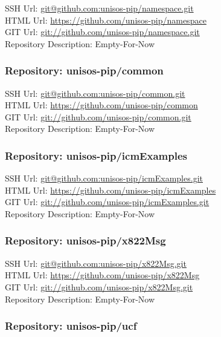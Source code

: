 SSH Url:  \url{git@github.com:unisos-pip/namespace.git}\\
HTML Url: \url{https://github.com/unisos-pip/namespace}\\
GIT Url:  \url{git://github.com/unisos-pip/namespace.git}\\


Repository Description: Empty-For-Now

\subsubsection{Repository: unisos-pip/common}

SSH Url:  \url{git@github.com:unisos-pip/common.git}\\
HTML Url: \url{https://github.com/unisos-pip/common}\\
GIT Url:  \url{git://github.com/unisos-pip/common.git}\\


Repository Description: Empty-For-Now

\subsubsection{Repository: unisos-pip/icmExamples}

SSH Url:  \url{git@github.com:unisos-pip/icmExamples.git}\\
HTML Url: \url{https://github.com/unisos-pip/icmExamples}\\
GIT Url:  \url{git://github.com/unisos-pip/icmExamples.git}\\


Repository Description: Empty-For-Now

\subsubsection{Repository: unisos-pip/x822Msg}

SSH Url:  \url{git@github.com:unisos-pip/x822Msg.git}\\
HTML Url: \url{https://github.com/unisos-pip/x822Msg}\\
GIT Url:  \url{git://github.com/unisos-pip/x822Msg.git}\\


Repository Description: Empty-For-Now

\subsubsection{Repository: unisos-pip/ucf}

